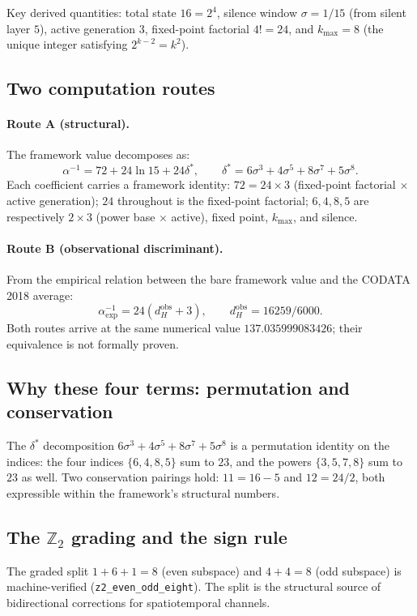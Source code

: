 \documentclass[11pt,twoside]{article}
\begin{document}
Key derived quantities: total state $16 = 2^4$, silence window $\sigma = 1/15$ (from silent layer $5$), active generation $3$, fixed-point factorial $4! = 24$, and $k_{\max} = 8$ (the unique integer satisfying $2^{k-2} = k^2$).

\subsection{Two computation routes}
\paragraph{Route A (structural).}
The framework value decomposes as:
\[
\alpha^{-1} = 72 + 24\ln 15 + 24\delta^*, \qquad
\delta^* = 6\sigma^3 + 4\sigma^5 + 8\sigma^7 + 5\sigma^8.
\]
Each coefficient carries a framework identity: $72 = 24\times 3$ (fixed-point factorial $\times$ active generation); $24$ throughout is the fixed-point factorial; $6,4,8,5$ are respectively $2\times 3$ (power base $\times$ active), fixed point, $k_{\max}$, and silence.

\paragraph{Route B (observational discriminant).}
From the empirical relation between the bare framework value and the CODATA 2018 average:
\[
\alpha^{-1}_{\mathrm{exp}} = 24(d_H^{\mathrm{obs}} + 3), \qquad d_H^{\mathrm{obs}} = 16259/6000.
\]
Both routes arrive at the same numerical value $137.035999083426$; their equivalence is not formally proven.

\subsection{Why these four terms: permutation and conservation}
The $\delta^*$ decomposition $6\sigma^3 + 4\sigma^5 + 8\sigma^7 + 5\sigma^8$ is a permutation identity on the indices: the four indices $\{6,4,8,5\}$ sum to $23$, and the powers $\{3,5,7,8\}$ sum to $23$ as well. Two conservation pairings hold: $11 = 16 - 5$ and $12 = 24/2$, both expressible within the framework's structural numbers.

\subsection{The $\mathbb{Z}_2$ grading and the sign rule}
The graded split $1+6+1 = 8$ (even subspace) and $4+4 = 8$ (odd subspace) is machine-verified (\texttt{z2\_even\_odd\_eight}). The split is the structural source of bidirectional corrections for spatiotemporal channels.
\end{document}
